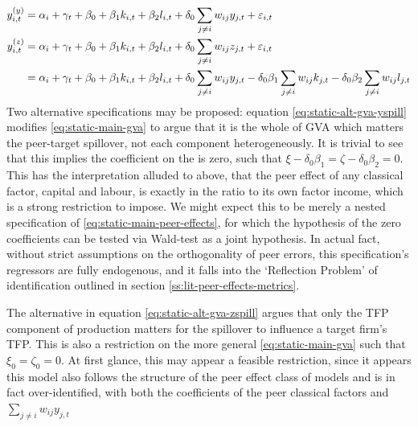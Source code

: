 \begin{align}
    \label{eq:static-alt-gva-yspill}
    y_{i,t}^{(y)} &= \alpha_i + \gamma_t + \beta_0
                + \beta_1 k_{i,t}
                + \beta_2 l_{i,t}
                + \delta_0 \sum_{j\neq i} w_{ij}y_{j,t}
                + \varepsilon_{i,t}
    \\
    \label{eq:static-alt-gva-zspill}
    y_{i,t}^{(z)} &= \alpha_i + \gamma_t + \beta_0
                    + \beta_1 k_{i,t}
                    + \beta_2 l_{i,t} 
                    + \delta_0 \sum_{j\neq i} w_{ij}z_{j,t}
                    + \varepsilon_{i,t}
    \\ \notag
                &= \alpha_i + \gamma_t + \beta_0
                    + \beta_1 k_{i,t}
                    + \beta_2 l_{i,t} 
                    + \delta_0 \sum_{j\neq i} w_{ij}y_{j,t}
                    - \delta_0\beta_1 \sum_{j\neq i} w_{ij}k_{j,t}
                    - \delta_0\beta_2 \sum_{j\neq i} w_{ij}l_{j,t}
\end{align}
%
Two alternative specifications may be proposed: equation \eqref{eq:static-alt-gva-yspill}
modifies \eqref{eq:static-main-gva} to argue that it is the whole of GVA which matters the peer-target spillover,
not each component heterogeneously. It is trivial to see that this implies the coefficient on the 
is zero, such that $\xi-\delta_0\beta_1=\zeta-\delta_0\beta_2=0$.
This has the interpretation alluded to above,
that the peer effect of any classical factor, capital and labour,
is exactly in the ratio to its own factor income,
which is a strong restriction to impose.
We might expect this to be merely a nested specification of \eqref{eq:static-main-peer-effects},
for which the hypothesis of the zero coefficients can be tested via Wald-test as a joint hypothesis.
In actual fact, without strict assumptions on the orthogonality of peer errors,
this specification's regressors are fully endogenous, and it falls into
the `Reflection Problem' of identification outlined in section \ref{ss:lit-peer-effects-metrics}.
\par
The alternative in equation \eqref{eq:static-alt-gva-zspill} argues that only the TFP component of production
matters for the spillover to influence a target firm's TFP.
This is also a restriction on the more general \eqref{eq:static-main-gva} such that $\xi_0=\zeta_0=0$.
At first glance, this may appear a feasible restriction,
since it appears this model also follows the structure of the peer effect class of models
and is in fact over-identified,
with both the coefficients of the peer classical factors and $\sum_{j\neq i}w_{ij}y_{j,t}$
